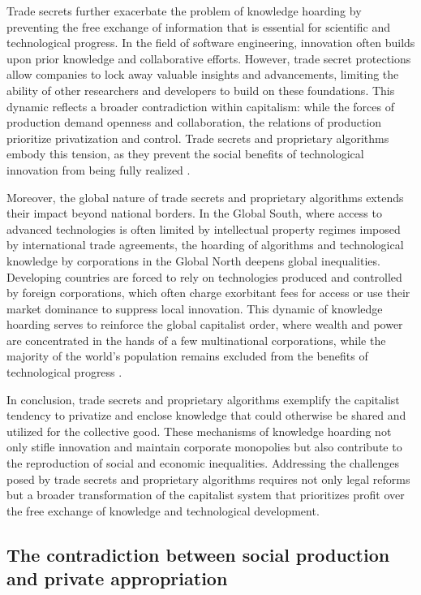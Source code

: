 Trade secrets further exacerbate the problem of knowledge hoarding by preventing the free exchange of information that is essential for scientific and technological progress. In the field of software engineering, innovation often builds upon prior knowledge and collaborative efforts. However, trade secret protections allow companies to lock away valuable insights and advancements, limiting the ability of other researchers and developers to build on these foundations. This dynamic reflects a broader contradiction within capitalism: while the forces of production demand openness and collaboration, the relations of production prioritize privatization and control. Trade secrets and proprietary algorithms embody this tension, as they prevent the social benefits of technological innovation from being fully realized \cite[pp.~45-47]{bessen2014}.

Moreover, the global nature of trade secrets and proprietary algorithms extends their impact beyond national borders. In the Global South, where access to advanced technologies is often limited by intellectual property regimes imposed by international trade agreements, the hoarding of algorithms and technological knowledge by corporations in the Global North deepens global inequalities. Developing countries are forced to rely on technologies produced and controlled by foreign corporations, which often charge exorbitant fees for access or use their market dominance to suppress local innovation. This dynamic of knowledge hoarding serves to reinforce the global capitalist order, where wealth and power are concentrated in the hands of a few multinational corporations, while the majority of the world’s population remains excluded from the benefits of technological progress \cite[pp.~30-33]{may2010}.

In conclusion, trade secrets and proprietary algorithms exemplify the capitalist tendency to privatize and enclose knowledge that could otherwise be shared and utilized for the collective good. These mechanisms of knowledge hoarding not only stifle innovation and maintain corporate monopolies but also contribute to the reproduction of social and economic inequalities. Addressing the challenges posed by trade secrets and proprietary algorithms requires not only legal reforms but a broader transformation of the capitalist system that prioritizes profit over the free exchange of knowledge and technological development.

\subsection{The contradiction between social production and private appropriation}

